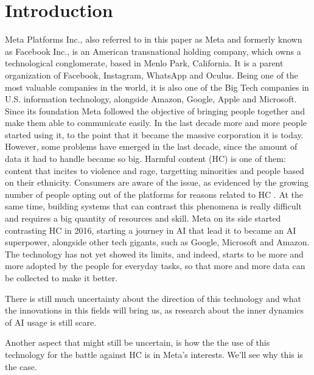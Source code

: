 \section{Introduction}

Meta Platforms Inc., also referred to in this paper as Meta and
formerly known as Facebook Inc., is an American transnational holding
company, which owns a technological conglomerate, based in Menlo Park,
California. It is a parent organization of Facebook, Instagram,
WhatsApp and Oculus. Being one of the most valuable companies in the
world, it is also one of the Big Tech companies in U.S. information
technology, alongside Amazon, Google, Apple and Microsoft. Since its
foundation Meta followed the objective of bringing people together and
make them able to communicate easily. In the last decade more and more
people started using it, to the point that it became the massive
corporation it is today. However, some problems have emerged in the
last decade, since the amount of data it had to handle became so
big. Harmful content (HC) is one of them: content that incites to
violence and rage, targetting minorities and people based on their
ethnicity. Consumers are aware of the issue, as evidenced by the
growing number of people opting out of the platforms for reasons
related to HC \cite{art:fortuna2018survey}. At the same time, building
systems that can contrast this phenomena is really difficult and
requires a big quantity of resources and skill. Meta on its side
started contrasting HC in 2016, starting a journey in AI that lead it
to became an AI superpower, alongside other tech gigants, such as
Google, Microsoft and Amazon. The technology has not yet showed its
limits, and indeed, starts to be more and more adopted by the people
for everyday tasks, so that more and more data can be collected to
make it better.

There is still much uncertainty about the direction of this technology
and what the innovations in this fields will bring us, as research
about the inner dynamics of AI usage is still scare.

Another aspect that might still be uncertain, is how the the use of
this technology for the battle against HC is in Meta's
interests. We'll see why this is the case.
